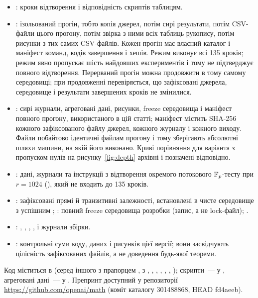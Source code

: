 \documentclass[11pt]{article}
\theoremstyle{plain}
\begin{document}
\begin{itemize}
\item {}: кроки відтворення і відповідність скриптів таблицям.
\item {}: ізольований прогін, тобто копія джерел, потім сирі результати, потім CSV-файли цього прогону, потім звірка з ними всіх таблиць рукопису, потім рисунки з тих самих CSV-файлів. Кожен прогін має власний каталог і маніфест команд, кодів завершення і хешів. Режим  виконує всі 135 кроків; режим  явно пропускає шість найдовших експериментів і тому не підтверджує повного відтворення. Перерваний прогін можна продовжити в тому самому середовищі; при продовженні перевіряється, що зафіксовані джерела, середовище і результати завершених кроків не змінилися.
\item {}: сирі журнали, агреговані дані, рисунки, freeze середовища і маніфест повного прогону, використаного в цій статті; маніфест містить SHA-256 кожного зафіксованого файлу джерел, кожного журналу і кожного виходу. Файли побайтово ідентичні файлам прогону і тому зберігають абсолютні шляхи машини, на якій його виконано. Криві порівняння для варіанта з пропуском нулів на рисунку~\ref{fig:depth} архівні і позначені відповідно.
\item {}: дані, журнали та інструкції з відтворення окремого потокового $\mathbb{F}_p$-тесту при $r=1024$ (), який не входить до 135 кроків.
\item {}: зафіксовані прямі й транзитивні залежності, встановлені в чисте середовище з успішним ; : повний freeze середовища розробки (запис, а не lock-файл); .
\item {}: , , , ,  і журнали збірки.
\item {}: контрольні суми коду, даних і рисунків цієї версії; вони засвідчують цілісність зафіксованих файлів, а не доведення будь-якої теореми.
\end{itemize}
Код міститься в  (серед іншого  з прапорцем ,  з , , , , , , ); скрипти~--- у , агреговані дані~--- у . Препринт доступний у репозиторії \url{https://github.com/openai/math} (коміт каталогу 301488868, HEAD fd4aeeb).
\end{document}
